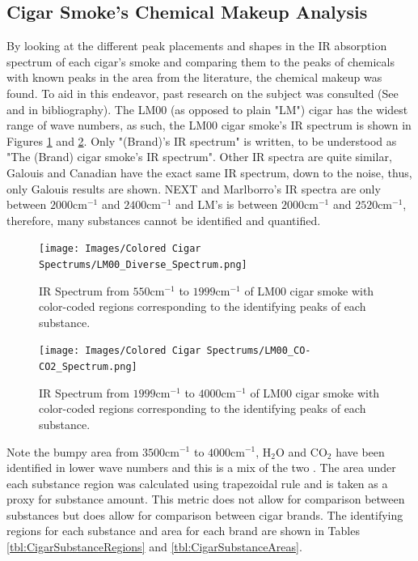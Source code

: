 \documentclass[reprint,amsmath,amssymb,aps, prl]{revtex4-2}
\begin{document}
\subsection{Cigar Smoke's Chemical Makeup Analysis}
By looking at the different peak placements and shapes in the IR absorption spectrum of each cigar's smoke and comparing them to the peaks of chemicals with known peaks in the area from the literature\cite{NISTwebook}, 
the chemical makeup was found. To aid in this endeavor, past research
on the subject was consulted (See \cite{IRCEllSMOKE} and \cite{FTIRSPECTRAOFSMOKE} in bibliography). The LM00 (as opposed to plain "LM") cigar has the widest range of wave numbers, as such, the LM00 cigar smoke's IR spectrum is shown in Figures \ref{fig:DiverseLM} and \ref{fig:COCO2LM}. Only "(Brand)'s IR spectrum" is written, to be understood as "The (Brand) cigar smoke's IR spectrum". Other IR spectra are quite similar, Galouis and Canadian have the exact same IR spectrum, down to the noise, thus, only Galouis results are shown. NEXT and Marlborro's IR spectra are only between $2000\text{cm}^{-1}$ and $2400\text{cm}^{-1}$ and LM's is between $2000\text{cm}^{-1}$ and $2520\text{cm}^{-1}$, therefore, many substances cannot be identified and quantified.
\begin{figure}
    \texttt{[image: Images/Colored Cigar Spectrums/LM00\_Diverse\_Spectrum.png]} 
    \caption{IR Spectrum from $550 \text{cm}^{-1}$ to $1999\text{cm}^{-1}$ of LM00 cigar smoke with color-coded regions corresponding to the identifying peaks of each substance.}
    \label{fig:DiverseLM}
\end{figure}

\begin{figure}
    \texttt{[image: Images/Colored Cigar Spectrums/LM00\_CO-CO2\_Spectrum.png]} 
    \caption{IR Spectrum from $1999 \text{cm}^{-1}$ to $4000 \text{cm}^{-1}$ of LM00 cigar smoke with color-coded regions corresponding to the identifying peaks of each substance.}
    \label{fig:COCO2LM}
\end{figure}
Note the bumpy area from $3500 \text{cm}^{-1}$ to $4000 \text{cm}^{-1}$, $\text{H}_{2}\text{O}$ and $\text{CO}_{2}$ have been identified in lower wave numbers and this is a mix of the two \cite{FTIRSPECTRAOFSMOKE}.
The area under each substance region was calculated using trapezoidal rule \cite{numerical} 
and is taken as a proxy for substance amount. This metric does not allow for comparison between substances but does allow for comparison between cigar brands.
The identifying regions for each substance and area for each brand are shown in Tables \ref{tbl:CigarSubstanceRegions} and \ref{tbl:CigarSubstanceAreas}. %
\end{document}
